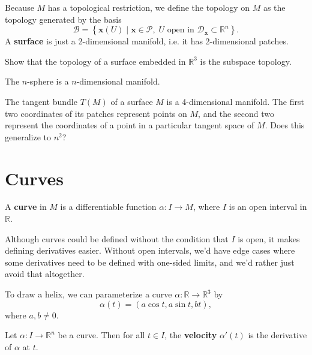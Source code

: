 \documentclass[10pt]{report}
\begin{document}
Because $M$ has a topological restriction, we define the topology on $M$ as the topology generated by the basis
\[
	\mathcal{B} = \left\{ \mathbf{x}(U) \;|\; \mathbf{x} \in \mathcal{P},\; U \text{ open in } \mathcal{D}_{\mathbf{x}} \subset \mathbb{R}^n \right\}.
\] 
A \textbf{surface} is just a 2-dimensional manifold, i.e. it has 2-dimensional patches.

{\color{red}Show that the topology of a surface embedded in $\mathbb{R}^3$ is the subspace topology.}

\begin{ex}[]
The $n$-sphere is a $n$-dimensional manifold.
\end{ex}

\begin{ex}[]
	The tangent bundle $T(M)$ of a surface $M$ is a 4-dimensional manifold. The first two coordinates of its patches represent points on $M$, and the second two represent the coordinates of a point in a particular tangent space of $M$. {\color{red}Does this generalize to $n^2$?}
\end{ex}


\section{Curves}

\begin{defn}
A \textbf{curve} in $M$ is a differentiable function $\alpha:I\to M$, where $I$ is an open interval in $\mathbb{R}$.
\end{defn}

Although curves could be defined without the condition that $I$ is open, it makes defining derivatives easier. Without open intervals, we'd have edge cases where some derivatives need to be defined with one-sided limits, and we'd rather just avoid that altogether.
\pagebreak

\begin{ex}
	To draw a helix, we can parameterize a curve $\alpha:\mathbb{R}\to \mathbb{R}^3$ by 
	\[
		\alpha(t)=(a \cos t, a \sin t, bt),
	\] where $a, b\neq 0$.
\end{ex}

\begin{defn}
	Let $\alpha:I\to \mathbb{R}^n$ be a curve. Then for all $t \in I$, the \textbf{velocity} $\alpha'(t)$ is the derivative of $\alpha$ at $t$.
\end{defn}
\end{document}
